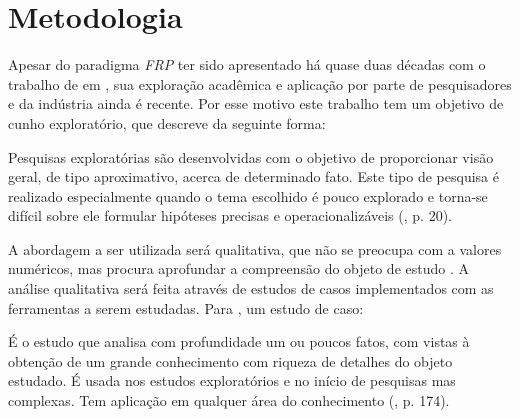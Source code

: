 \section{Metodologia}\label{lmetodologia}


Apesar do paradigma \textit{FRP} ter sido apresentado há
quase duas décadas com o trabalho de 
em \citeyear{Elliott97franimation}, sua exploração acadêmica
e aplicação por parte de pesquisadores e da indústria ainda é
recente. Por esse motivo este trabalho tem um objetivo de
cunho exploratório, que 
descreve da seguinte forma:

\begin{citacao}
  Pesquisas exploratórias são desenvolvidas com o
  objetivo de proporcionar visão geral, de tipo aproximativo,
  acerca de determinado fato.
  Este tipo de pesquisa é realizado especialmente quando o
  tema escolhido é pouco explorado e torna-se difícil sobre
  ele formular hipóteses precisas e operacionalizáveis
  (\citeyear{gil2010metodos}, p. 20).
\end{citacao}

A abordagem a ser utilizada será qualitativa, que não se
preocupa com a valores numéricos, mas procura aprofundar
a compreensão do objeto de estudo \cite[p.~31]{gerhardt2009metodos}.
A análise qualitativa será feita através de estudos de casos
implementados com as ferramentas a serem estudadas.
Para , um estudo de caso:

\begin{citacao}
  É o estudo que analisa com profundidade um ou poucos fatos,
  com vistas à obtenção de um grande conhecimento com riqueza
  de detalhes do objeto estudado. É usada nos estudos exploratórios
  e no início de pesquisas mas complexas. Tem aplicação em
  qualquer área do conhecimento (\citeyear{gil2010metodos}, p. 174).
\end{citacao}
